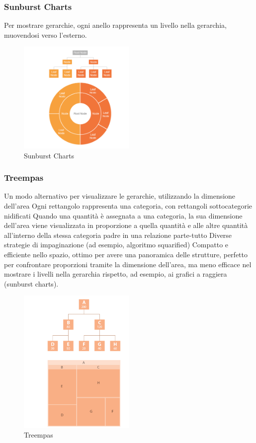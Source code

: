 \subsubsection{Sunburst Charts}
Per mostrare gerarchie, ogni anello rappresenta un livello nella gerarchia,
 muovendosi verso l'esterno.
\begin{figure}[H]
    \centering
    \includegraphics[width=0.5\textwidth]{images/SunBurst.png} %
    \caption{Sunburst Charts}
    \label{fig:immagine}
\end{figure}
\subsubsection{Treempas}

Un modo alternativo per visualizzare le gerarchie, utilizzando la dimensione dell'area
Ogni rettangolo rappresenta una categoria, con rettangoli sottocategorie nidificati
Quando una quantità è assegnata a una categoria, la sua dimensione dell'area viene visualizzata in proporzione a quella quantità e alle altre quantità all'interno della stessa categoria padre in una relazione parte-tutto
Diverse strategie di impaginazione (ad esempio, algoritmo squarified)
Compatto e efficiente nello spazio, ottimo per avere una panoramica delle strutture, perfetto per confrontare proporzioni tramite la dimensione dell'area, ma meno efficace nel mostrare i livelli nella gerarchia rispetto, ad esempio, ai grafici a raggiera (sunburst charts).
\begin{figure}[H]
    \centering
    \includegraphics[width=0.5\textwidth]{images/TreeMpas.png} %
    \caption{Treempas}
    \label{fig:immagine}
\end{figure}